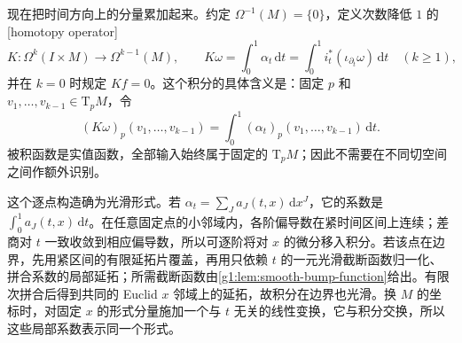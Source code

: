 \ProseParagraphBreak

现在把时间方向上的分量累加起来。约定 \(\Omega^{-1}(M)=\{0\}\)，定义次数降低 \(1\) 的[homotopy operator]
\begin{equation}
	\label{g1:eq:homotopy-operator}
	K:\Omega^k(I\times M)\longrightarrow\Omega^{k-1}(M),\qquad
	K\omega=\int_0^1\alpha_t\,\mathrm{d}t
	=\int_0^1 i_t^*(\iota_{\partial_t}\omega)\,\mathrm{d}t
	\quad(k\ge1),
\end{equation}
并在 \(k=0\) 时规定 \(Kf=0\)。这个积分的具体含义是：固定 \(p\) 和 \(v_1,\ldots,v_{k-1}\in \mathrm{T}_pM\)，令
\[
	(K\omega)_p(v_1,\ldots,v_{k-1})
	=\int_0^1(\alpha_t)_p(v_1,\ldots,v_{k-1})\,\mathrm{d}t.
\]
被积函数是实值函数，全部输入始终属于固定的 \(\mathrm{T}_pM\)；因此不需要在不同切空间之间作额外识别。

\ProseParagraphBreak

这个逐点构造确为光滑形式。若 \(\alpha_t=\sum_J a_J(t,x)\,\mathrm{d}x^J\)，它的系数是 \(\int_0^1a_J(t,x)\,\mathrm{d}t\)。在任意固定点的小邻域内，各阶偏导数在紧时间区间上连续；差商对 \(t\) 一致收敛到相应偏导数，所以可逐阶将对 \(x\) 的微分移入积分。若该点在边界，先用紧区间的有限延拓片覆盖，再用只依赖 \(t\) 的一元光滑截断函数归一化、拼合系数的局部延拓；所需截断函数由\cref{g1:lem:smooth-bump-function}给出。有限次拼合后得到共同的 Euclid  \(x\) 邻域上的延拓，故积分在边界也光滑。换 \(M\) 的坐标时，对固定 \(x\) 的形式分量施加一个与 \(t\) 无关的线性变换，它与积分交换，所以这些局部系数表示同一个形式。

